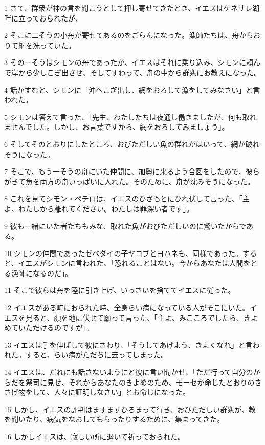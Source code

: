 \par 1 さて、群衆が神の言を聞こうとして押し寄せてきたとき、イエスはゲネサレ湖畔に立っておられたが、
\par 2 そこに二そうの小舟が寄せてあるのをごらんになった。漁師たちは、舟からおりて網を洗っていた。
\par 3 その一そうはシモンの舟であったが、イエスはそれに乗り込み、シモンに頼んで岸から少しこぎ出させ、そしてすわって、舟の中から群衆にお教えになった。
\par 4 話がすむと、シモンに「沖へこぎ出し、網をおろして漁をしてみなさい」と言われた。
\par 5 シモンは答えて言った、「先生、わたしたちは夜通し働きましたが、何も取れませんでした。しかし、お言葉ですから、網をおろしてみましょう」。
\par 6 そしてそのとおりにしたところ、おびただしい魚の群れがはいって、網が破れそうになった。
\par 7 そこで、もう一そうの舟にいた仲間に、加勢に来るよう合図をしたので、彼らがきて魚を両方の舟いっぱいに入れた。そのために、舟が沈みそうになった。
\par 8 これを見てシモン・ペテロは、イエスのひざもとにひれ伏して言った、「主よ、わたしから離れてください。わたしは罪深い者です」。
\par 9 彼も一緒にいた者たちもみな、取れた魚がおびただしいのに驚いたからである。
\par 10 シモンの仲間であったゼベダイの子ヤコブとヨハネも、同様であった。すると、イエスがシモンに言われた、「恐れることはない。今からあなたは人間をとる漁師になるのだ」。
\par 11 そこで彼らは舟を陸に引き上げ、いっさいを捨ててイエスに従った。
\par 12 イエスがある町におられた時、全身らい病になっている人がそこにいた。イエスを見ると、顔を地に伏せて願って言った、「主よ、みこころでしたら、きよめていただけるのですが」。
\par 13 イエスは手を伸ばして彼にさわり、「そうしてあげよう、きよくなれ」と言われた。すると、らい病がただちに去ってしまった。
\par 14 イエスは、だれにも話さないようにと彼に言い聞かせ、「ただ行って自分のからだを祭司に見せ、それからあなたのきよめのため、モーセが命じたとおりのささげ物をして、人々に証明しなさい」とお命じになった。
\par 15 しかし、イエスの評判はますますひろまって行き、おびただしい群衆が、教を聞いたり、病気をなおしてもらったりするために、集まってきた。
\par 16 しかしイエスは、寂しい所に退いて祈っておられた。
